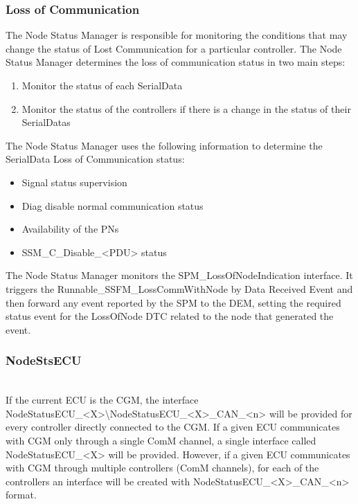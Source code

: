 \subsubsection{Loss of Communication}

The Node Status Manager is responsible for monitoring the conditions that may change the status of Lost Communication for a particular controller.
The Node Status Manager determines the loss of communication status in two main steps:
\begin{enumerate}
    \item Monitor the status of each SerialData
    \item Monitor the status of the controllers if there is a change in the status of their SerialDatas
\end{enumerate}

The Node Status Manager uses the following information to determine the SerialData Loss of Communication status:
\begin{itemize}
    \item Signal status supervision
    \item Diag disable normal communication status
    \item Availability of the PNs
    \item SSM_C_Disable_<PDU> status
\end{itemize}


The Node Status Manager monitors the SPM_LossOfNodeIndication interface.
It triggers the Runnable_SSFM_LossCommWithNode by Data Received Event and then forward any event reported by the
SPM to the DEM, setting the required status event for the LossOfNode DTC related to the node that generated the event.

{    }


\subsubsection{NodeStsECU}
\\

If the current ECU is the CGM, the interface NodeStatusECU_<X>\textbackslash NodeStatusECU_<X>_CAN_<n> will be provided for every controller directly connected to the CGM. If a given ECU communicates with CGM only through
a single ComM channel, a single interface called NodeStatusECU_<X> will be provided. However, if a given ECU communicates with CGM through multiple controllers (ComM channels), for each of the controllers an interface 
will be created with NodeStatusECU_<X>_CAN_<n> format.

